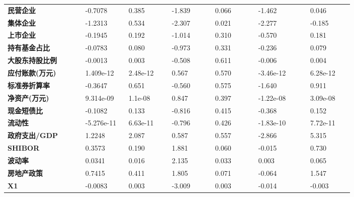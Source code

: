\begin{center}
\begin{longtable}{p{0.18\linewidth}p{0.1\linewidth}p{0.1\linewidth}p{0.1\linewidth}p{0.1\linewidth}p{0.12\linewidth}p{0.1\linewidth}}
		\textbf{民营企业}       & -0.7078       & 0.385            & -1.839     & 0.066               & -1.462          & 0.046           \\
		\textbf{集体企业}       & -1.2313       & 0.534            & -2.307     & 0.021               & -2.277          & -0.185          \\
		\textbf{上市企业}       & -0.1945       & 0.192            & -1.014     & 0.310               & -0.570          & 0.181           \\
		\textbf{持有基金占比}   & -0.0783       & 0.080            & -0.973     & 0.331               & -0.236          & 0.079           \\
		\textbf{大股东持股比例} & -0.0013       & 0.003            & -0.508     & 0.611               & -0.006          & 0.004           \\
		\textbf{应付账款(万元)} & 1.409e-12     & 2.48e-12         & 0.567      & 0.570               & -3.46e-12       & 6.28e-12        \\
		\textbf{标准券折算率}   & -0.3647       & 0.651            & -0.560     & 0.575               & -1.640          & 0.911           \\
		\textbf{净资产(万元)}   & 9.314e-09     & 1.1e-08          & 0.847      & 0.397               & -1.22e-08       & 3.09e-08        \\
		\textbf{现金短债比}     & -0.1082       & 0.133            & -0.816     & 0.415               & -0.368          & 0.152           \\
		\textbf{流动性}         & -5.276e-11    & 6.63e-11         & -0.796     & 0.426               & -1.83e-10       & 7.72e-11        \\
		\textbf{政府支出/GDP}   & 1.2248        & 2.087            & 0.587      & 0.557               & -2.866          & 5.315           \\
		\textbf{SHIBOR}         & 0.3573        & 0.190            & 1.881      & 0.060               & -0.015          & 0.730           \\
		\textbf{波动率}         & 0.0341        & 0.016            & 2.135      & 0.033               & 0.003           & 0.065           \\
		\textbf{房地产政策}     & 0.7415        & 0.411            & 1.805      & 0.071               & -0.064          & 1.547           \\
		\textbf{X1}             & -0.0083       & 0.003            & -3.009     & 0.003               & -0.014          & -0.003          \\

\end{longtable}
\end{center}

